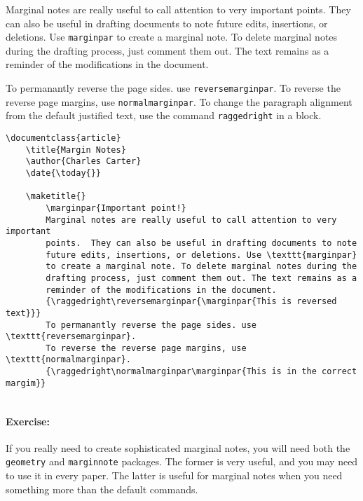 
        Marginal notes are really useful to call attention to very important points.  They can also be useful in drafting documents to note future edits, insertions, or deletions. Use \texttt{marginpar} to create a marginal note. To delete marginal notes during the drafting process, just comment them out. The text remains as a reminder of the modifications in the document.

        {\raggedright{}}

        To permanantly reverse the page sides. use \texttt{reversemarginpar}. To reverse the reverse page margins, use \texttt{normalmarginpar}. To change the paragraph alignment from the default justified text, use the command \texttt{raggedright} in a block.

        {\raggedright\normalmarginpar{}}

        \begin{verbatim}
\documentclass{article}
    \title{Margin Notes}
    \author{Charles Carter}
    \date{\today{}}
 
    \maketitle{}
        \marginpar{Important point!}
        Marginal notes are really useful to call attention to very important 
        points.  They can also be useful in drafting documents to note 
        future edits, insertions, or deletions. Use \texttt{marginpar} 
        to create a marginal note. To delete marginal notes during the 
        drafting process, just comment them out. The text remains as a 
        reminder of the modifications in the document.
        {\raggedright\reversemarginpar{\marginpar{This is reversed text}}}
        To permanantly reverse the page sides. use \texttt{reversemarginpar}.
        To reverse the reverse page margins, use \texttt{normalmarginpar}.
        {\raggedright\normalmarginpar\marginpar{This is in the correct margim}}
    
        \end{verbatim}

        \paragraph{Exercise:} If you really need to create sophisticated marginal notes, you will need both the \texttt{geometry} and \texttt{marginnote} packages. The former is very useful, and you may need to use it in every paper. The latter is useful for marginal notes when you need something more than the default \Lx{} commands.

